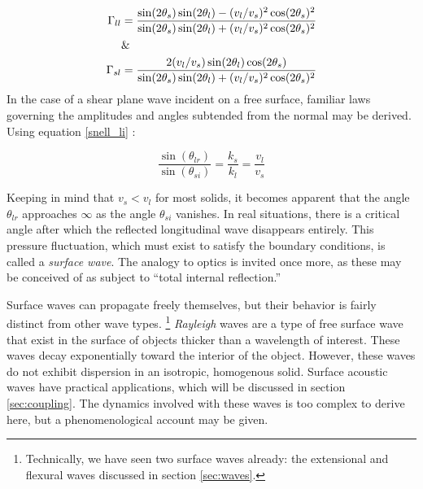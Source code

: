 \documentclass[a4paper,10pt]{report}
\numberwithin{equation}{section}
\begin{document}
\begin{align}\label{gamma_llsl}
\Gamma_{ll} &= \frac{\sin(2\theta_s)\sin(2\theta_l) - (v_l / v_s)^2\cos(2\theta_s)^2}{\sin(2\theta_s)\sin(2\theta_l) + (v_l / v_s)^2\cos(2\theta_s)^2}\\
&\text{\&}\notag\\
\Gamma_{sl} &= \frac{2(v_l/v_s) \sin(2\theta_l)\cos(2\theta_s)}{\sin(2\theta_s)\sin(2\theta_l) + (v_l / v_s)^2\cos(2\theta_s)^2}
\end{align}
In the case of a shear plane wave incident on a free surface, familiar laws governing the amplitudes and angles subtended from the normal may be derived. Using equation \eqref{snell_li} :

\begin{equation}\label{snell_si}
\frac{\sin(\theta_{lr})}{\sin(\theta_{si})} = \frac{k_s}{k_l} = \frac{v_l}{v_s}
\end{equation}

Keeping in mind that $v_s < v_l$ for most solids, it becomes apparent that the angle $\theta_{lr}$ approaches $\infty$ as the angle $\theta_{si}$ vanishes. In real situations, there is a critical angle after which the reflected longitudinal wave disappears entirely. This pressure fluctuation, which must exist to satisfy the boundary conditions, is called a \emph{surface wave}. The analogy to optics is invited once more, as these may be conceived of as subject to ``total internal reflection.''\cite[p.~145]{Cremer1973} 

Surface waves can propagate freely themselves, but their behavior is fairly distinct from other wave types. \footnote{Technically, we have seen two surface waves already: the extensional and flexural waves discussed in section \ref{sec:waves}.} \cite[p.~150]{Cremer1973} \emph{Rayleigh} waves are a type of free surface wave that exist in the surface of objects thicker than a wavelength of interest. These waves decay exponentially toward the interior of the object. However, these waves do not exhibit dispersion in an isotropic, homogenous solid.\cite[p.~152]{Cremer1973}\cite[p.~113]{Kino1987} Surface acoustic waves have practical applications, which will be discussed in section \ref{sec:coupling}. The dynamics involved with these waves is too complex to derive here, but a phenomenological account may be given. 
\end{document}
